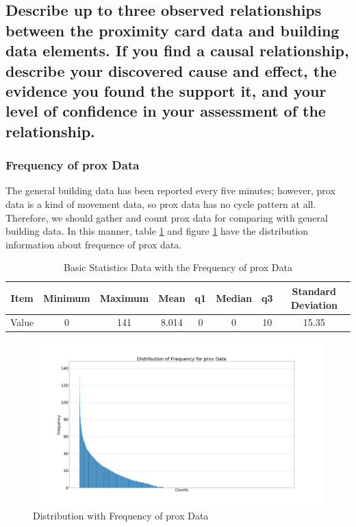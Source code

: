 \documentclass[aps, 10pt, a4paper]{article}
\begin{document}
        \subsection[Question 4]{Describe up to three observed relationships between the proximity card data and building data elements. If you find a causal relationship, describe your discovered cause and effect, the evidence you found the support it, and your level of confidence in your assessment of the relationship.}
            \label{sec:question4}
            \subsubsection{Frequency of prox Data}
                The general building data has been reported every five minutes; however, prox data is a kind of movement data, so prox data has no cycle pattern at all. Therefore, we should gather and count prox data for comparing with general building data. In this manner, table \ref{tb:freq} and figure \ref{fig:freq} have the distribution information about frequence of prox data. 
            
                \begin{table}[htbp]
                    \centering
                    \caption{Basic Statistics Data with the Frequency of prox Data}
                    \label{tb:freq}
                    \begin{tabular}{c||c|c|c|c|c|c|c}
                        Item & Minimum & Maximum & Mean & q1 & Median & q3 & Standard Deviation \\ \hline
                        Value & 0 & 141 & 8.014 & 0 & 0 & 10 & 15.35 \\
                    \end{tabular}
                \end{table}
            
                \begin{figure}[htbp]
                    \centering
                    \includegraphics[width=0.4 \linewidth]{figures/freq.png}
                    \caption{Distribution with Frequency of prox Data}
                    \label{fig:freq}
                \end{figure}
            
\end{document}
